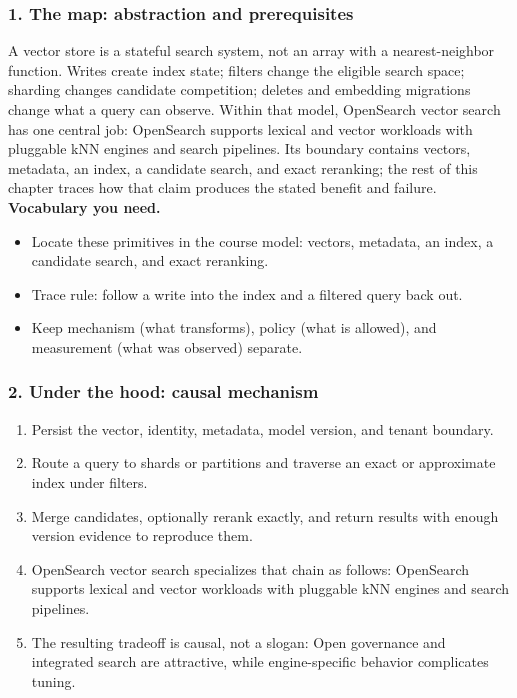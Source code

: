 \subsubsection*{1. The map: abstraction and prerequisites}
A vector store is a stateful search system, not an array with a nearest-neighbor function. Writes create index state; filters change the eligible search space; sharding changes candidate competition; deletes and embedding migrations change what a query can observe.
Within that model, OpenSearch vector search has one central job: OpenSearch supports lexical and vector workloads with pluggable kNN engines and search pipelines. Its boundary contains vectors, metadata, an index, a candidate search, and exact reranking; the rest of this chapter traces how that claim produces the stated benefit and failure.
\textbf{Vocabulary you need.}\begin{itemize}
\item Locate these primitives in the course model: vectors, metadata, an index, a candidate search, and exact reranking.
\item Trace rule: follow a write into the index and a filtered query back out.
\item Keep mechanism (what transforms), policy (what is allowed), and measurement (what was observed) separate.
\end{itemize}
\subsubsection*{2. Under the hood: causal mechanism}\begin{enumerate}
\item Persist the vector, identity, metadata, model version, and tenant boundary.
\item Route a query to shards or partitions and traverse an exact or approximate index under filters.
\item Merge candidates, optionally rerank exactly, and return results with enough version evidence to reproduce them.
\item OpenSearch vector search specializes that chain as follows: OpenSearch supports lexical and vector workloads with pluggable kNN engines and search pipelines.
\item The resulting tradeoff is causal, not a slogan: Open governance and integrated search are attractive, while engine-specific behavior complicates tuning.
\end{enumerate}
